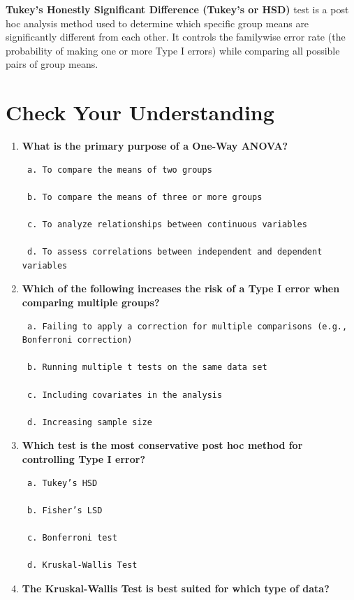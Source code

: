 \documentclass[
  letterpaper,
  DIV=11,
  numbers=noendperiod]{scrreprt}
\begin{document}
\textbf{Tukey's Honestly Significant Difference (Tukey's or HSD)} test
is a post hoc analysis method used to determine which specific group
means are significantly different from each other. It controls the
familywise error rate (the probability of making one or more Type I
errors) while comparing all possible pairs of group means.

\section*{Check Your Understanding}\label{check-your-understanding-9}


\begin{enumerate}
\def\labelenumi{\arabic{enumi}.}
\item
  \textbf{What is the primary purpose of a One-Way ANOVA?}

\begin{verbatim}
 a. To compare the means of two groups 

 b. To compare the means of three or more groups 

 c. To analyze relationships between continuous variables 

 d. To assess correlations between independent and dependent variables   
\end{verbatim}
\item
  \textbf{Which of the following increases the risk of a Type I error
  when comparing multiple groups?}

\begin{verbatim}
 a. Failing to apply a correction for multiple comparisons (e.g., Bonferroni correction) 

 b. Running multiple t tests on the same data set 

 c. Including covariates in the analysis 

 d. Increasing sample size 
\end{verbatim}
\item
  \textbf{Which test is the most conservative post hoc method for
  controlling Type I error?}

\begin{verbatim}
 a. Tukey’s HSD 

 b. Fisher’s LSD 

 c. Bonferroni test 

 d. Kruskal-Wallis Test 
\end{verbatim}
\item
  \textbf{The Kruskal-Wallis Test is best suited for which type of
  data?}


\end{enumerate}
\end{document}
